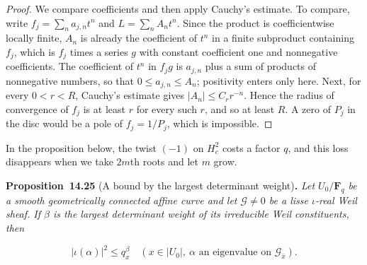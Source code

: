 \documentclass[11pt]{article}
\newenvironment{bpstatement}[2]{\par\addvspace{0.6\baselineskip}\noindent\textbf{#1}#2\textbf{.}\enspace\ignorespaces}
  {\par\addvspace{0.4\baselineskip}}
\newenvironment{bpstatementit}[2]{\begin{bpstatement}{#1}{#2}\itshape\ignorespaces}{\end{bpstatement}}
\begin{document}
\begin{proof}[{Proof}]\label{bp114}%
We compare coefficients and then apply Cauchy's estimate. To compare, write \(f_j=\sum_na_{j,n}t^n\) and \(L=\sum_nA_nt^n\). Since the product is coefficientwise locally finite, \(A_n\) is already the coefficient of \(t^n\) in a finite subproduct containing \(f_j\), which is \(f_j\) times a series \(g\) with constant coefficient one and nonnegative coefficients. The coefficient of \(t^n\) in \(f_jg\) is \(a_{j,n}\) plus a sum of products of nonnegative numbers, so that \(0\le a_{j,n}\le A_n\); positivity enters only here.  Next, for every \(0<r<R\), Cauchy's estimate gives \(|A_n|\le C_rr^{-n}\). Hence the radius of convergence of \(f_j\) is at least \(r\) for every such \(r\), and so at least \(R\).  A zero of \(P_j\) in the disc would be a pole of \(f_j=1/P_j\), which is impossible.
\end{proof}

\label{bp115}%
In the proposition below, the twist \((-1)\) on \(H^2_c\) costs a factor \(q\), and this loss disappears when we take \(2m\)th roots and let \(m\) grow.

\label{bp116}%
\begin{bpstatementit}{Proposition~14.25}{ (A bound by the largest determinant weight)}
Let \(U_0/\mathbf F_q\) be a smooth geometrically connected affine curve and let \(\mathcal G\ne0\) be a lisse \(\iota\)-real Weil sheaf.  If \(\beta\) is the largest determinant weight of its irreducible Weil constituents, then

\[
|\iota(\alpha)|^2\le q_x^\beta
\quad(x\in|U_0|,\ \alpha\text{ an eigenvalue on }\mathcal G_{\bar x}).
\]
\end{bpstatementit}
\end{document}
